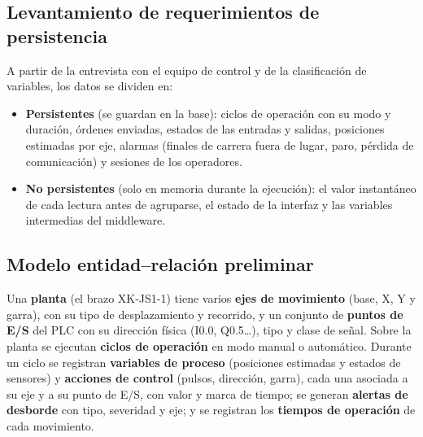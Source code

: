 \documentclass[a4paper,11pt]{article}
\begin{document}
\subsection{Levantamiento de requerimientos de persistencia}
A partir de la entrevista con el equipo de control y de la clasificación de variables, los datos se dividen en:
\begin{itemize}
\item \textbf{Persistentes} (se guardan en la base): ciclos de operación con su modo y duración, órdenes enviadas, estados de las entradas y salidas, posiciones estimadas por eje, alarmas (finales de carrera fuera de lugar, paro, pérdida de comunicación) y sesiones de los operadores.
\item \textbf{No persistentes} (solo en memoria durante la ejecución): el valor instantáneo de cada lectura antes de agruparse, el estado de la interfaz y las variables intermedias del middleware.
\end{itemize}

\subsection{Modelo entidad--relación preliminar}
Una \textbf{planta} (el brazo XK-JS1-1) tiene varios \textbf{ejes de movimiento} (base, X, Y y garra), con su tipo de desplazamiento y recorrido, y un conjunto de \textbf{puntos de E/S} del PLC con su dirección física (I0.0, Q0.5\dots), tipo y clase de señal. Sobre la planta se ejecutan \textbf{ciclos de operación} en modo manual o automático. Durante un ciclo se registran \textbf{variables de proceso} (posiciones estimadas y estados de sensores) y \textbf{acciones de control} (pulsos, dirección, garra), cada una asociada a su eje y a su punto de E/S, con valor y marca de tiempo; se generan \textbf{alertas de desborde} con tipo, severidad y eje; y se registran los \textbf{tiempos de operación} de cada movimiento.
\end{document}
